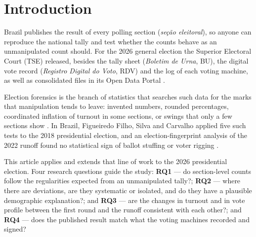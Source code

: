 \documentclass[fleqn,10pt]{SelfArx}
\affiliation{\textsuperscript{1}\textit{Programa de P\'os-Gradua\c{c}\~ao
em Computa\c{c}\~ao Aplicada (PPCA), Universidade de Bras\'ilia (UnB),
Bras\'ilia, DF, Brasil}}
\affiliation{*\textbf{Autor correspondente}:
cesar.moreira@aluno.unb.br}
\begin{document}
\flushbottom
\maketitle
\thispagestyle{empty}

\section{Introduction}
\label{sec:intro}

Brazil publishes the result of every polling section (\emph{se\c{c}\~ao
eleitoral}), so anyone can reproduce the national tally and test whether
the counts behave as an unmanipulated count should. For the 2026 general
election the Superior Electoral Court (TSE) released, besides the tally
sheet (\emph{Boletim de Urna}, BU), the digital vote record (\emph{Registro
Digital do Voto}, RDV) and the log of each voting machine, as well as
consolidated files in its Open Data Portal \cite{tse2026}.

Election forensics is the branch of statistics that searches such data for
the marks that manipulation tends to leave: invented numbers, rounded
percentages, coordinated inflation of turnout in some sections, or swings
that only a few sections show \cite{hicken2017,klimek2012}. In Brazil,
Figueiredo Filho, Silva and Carvalho \cite{figueiredo2022} applied five such
tests to the 2018 presidential election, and an election-fingerprint
analysis of the 2022 runoff found no statistical sign of ballot stuffing or
voter rigging \cite{csh2022}.

This article applies and extends that line of work to the 2026 presidential
election. Four research questions guide the study:
\textbf{RQ1} --- do section-level counts follow the regularities expected
from an unmanipulated tally?;
\textbf{RQ2} --- where there are deviations, are they systematic or
isolated, and do they have a plausible demographic explanation?; and
\textbf{RQ3} --- are the changes in turnout and in vote profile between the
first round and the runoff consistent with each other?; and
\textbf{RQ4} --- does the published result match what the voting machines
recorded and signed?
\end{document}
